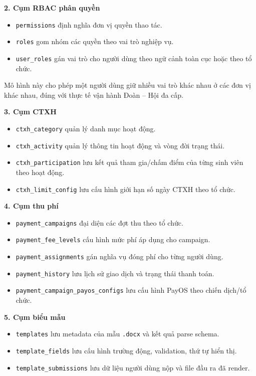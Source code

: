 \textbf{2. Cụm RBAC phân quyền}
\begin{itemize}
	\item \texttt{permissions} định nghĩa đơn vị quyền thao tác.
	\item \texttt{roles} gom nhóm các quyền theo vai trò nghiệp vụ.
	\item \texttt{user\_roles} gán vai trò cho người dùng theo ngữ cảnh toàn cục hoặc theo tổ chức.
\end{itemize}
Mô hình này cho phép một người dùng giữ nhiều vai trò khác nhau ở các đơn vị khác nhau, đúng với thực tế vận hành Đoàn -- Hội đa cấp.

\textbf{3. Cụm CTXH}
\begin{itemize}
	\item \texttt{ctxh\_category} quản lý danh mục hoạt động.
	\item \texttt{ctxh\_activity} quản lý thông tin hoạt động và vòng đời trạng thái.
	\item \texttt{ctxh\_participation} lưu kết quả tham gia/chấm điểm của từng sinh viên theo hoạt động.
	\item \texttt{ctxh\_limit\_config} lưu cấu hình giới hạn số ngày CTXH theo tổ chức.
\end{itemize}

\textbf{4. Cụm thu phí}
\begin{itemize}
	\item \texttt{payment\_campaigns} đại diện các đợt thu theo tổ chức.
	\item \texttt{payment\_fee\_levels} cấu hình mức phí áp dụng cho campaign.
	\item \texttt{payment\_assignments} gán nghĩa vụ đóng phí cho từng người dùng.
	\item \texttt{payment\_history} lưu lịch sử giao dịch và trạng thái thanh toán.
	\item \texttt{payment\_campaign\_payos\_configs} lưu cấu hình PayOS theo chiến dịch/tổ chức.
\end{itemize}

\textbf{5. Cụm biểu mẫu}
\begin{itemize}
	\item \texttt{templates} lưu metadata của mẫu \texttt{.docx} và kết quả parse schema.
	\item \texttt{template\_fields} lưu cấu hình trường động, validation, thứ tự hiển thị.
	\item \texttt{template\_submissions} lưu dữ liệu người dùng nộp và file đầu ra đã render.
\end{itemize}

